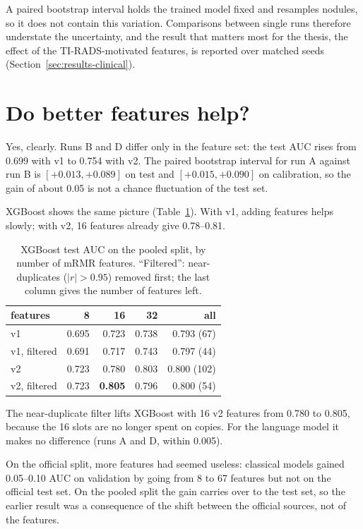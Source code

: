 A paired bootstrap interval holds the trained model fixed and resamples nodules, so it does not
contain this variation. Comparisons between single runs therefore understate the uncertainty, and
the result that matters most for the thesis, the effect of the TI-RADS-motivated features, is
reported over matched seeds (Section~\ref{sec:results-clinical}).

\section{Do better features help?}
\label{sec:results-features}

Yes, clearly. Runs B and D differ only in the feature set: the test AUC rises from 0.699 with v1
to 0.754 with v2. The paired bootstrap interval for run A against run B is $[+0.013, +0.089]$ on
test and $[+0.015, +0.090]$ on calibration, so the gain of about 0.05 is not a chance
fluctuation of the test set.

XGBoost shows the same picture (Table~\ref{tab:results-xgb}). With v1, adding features helps
slowly; with v2, 16 features already give 0.78--0.81.

\begin{table}[ht]
  \centering
  \caption{XGBoost test AUC on the pooled split, by number of mRMR features. ``Filtered'':
           near-duplicates ($|r| > 0.95$) removed first; the last column gives the number of
           features left.}
  \label{tab:results-xgb}
  \begin{tabular}{lrrrr}
    \toprule
    features & 8 & 16 & 32 & all \\
    \midrule
    v1           & 0.695 & 0.723 & 0.738 & 0.793 (67) \\
    v1, filtered & 0.691 & 0.717 & 0.743 & 0.797 (44) \\
    v2           & 0.723 & 0.780 & 0.803 & 0.800 (102) \\
    v2, filtered & 0.723 & \textbf{0.805} & 0.796 & 0.800 (54) \\
    \bottomrule
  \end{tabular}
\end{table}

The near-duplicate filter lifts XGBoost with 16 v2 features from 0.780 to 0.805, because the
16 slots are no longer spent on copies. For the language model it makes no difference (runs A and
D, within 0.005).

On the official split, more features had seemed useless: classical models gained 0.05--0.10 AUC
on validation by going from 8 to 67 features but not on the official test set. On the pooled split
the gain carries over to the test set, so the earlier result was a consequence of the shift
between the official sources, not of the features.

